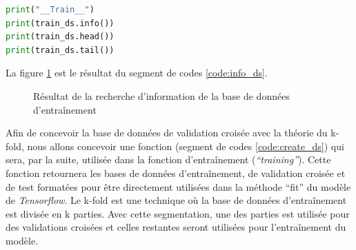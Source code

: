 \documentclass{article}
\begin{document}
\begin{lstlisting}[language=Python, caption={Avoir de l'information de la base de données d'entraînement}, label={code:info_ds}]
print("__Train__")
print(train_ds.info())
print(train_ds.head())
print(train_ds.tail())
\end{lstlisting}

La figure \ref{fig:result_info_ds} est le résultat du segment de codes \ref{code:info_ds}.

\begin{figure}[H]
  \centering
  \caption{Résultat de la recherche d'information de la base de données d'entraînement}
  \label{fig:result_info_ds}
\end{figure}

Afin de concevoir la base de données de validation croisée avec la théorie du k-fold, nous allons concevoir une fonction (segment de codes \ref{code:create_ds}) qui sera, par la suite, utilisée dans la fonction d'entraînement (\textit{``training''}). Cette fonction retournera les bases de données d'entraînement, de validation croisée et de test formatées pour être directement utilisées dans la méthode ``fit'' du modèle de \textit{Tensorflow}. Le k-fold est une technique où la base de données d'entraînement est divisée en k parties. Avec cette segmentation, une des parties est utilisée pour des validations croisées et celles restantes seront utilisées pour l'entraînement du modèle.
\medbreak
\end{document}
